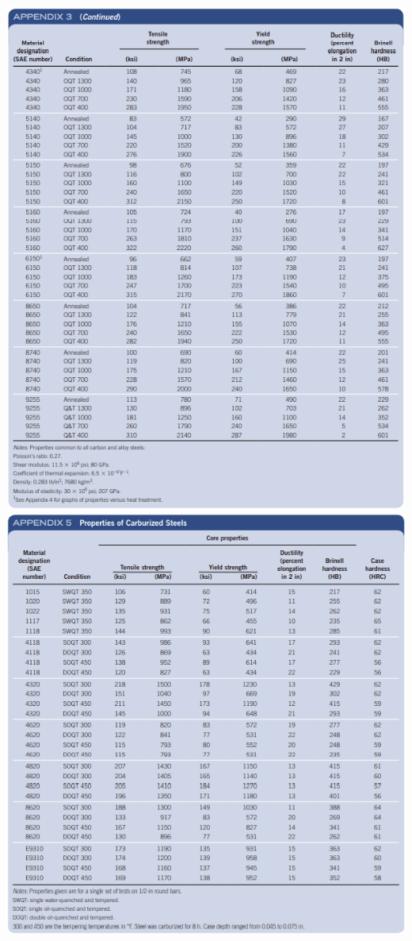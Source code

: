 \documentclass[11pt, fleqn]{article}
\begin{document}
\begin{enumerate}
    \includegraphics[scale=1]{Gears/Apx3b.png}\\
    \includegraphics[scale=1]{Gears/Apx5.png}

\end{enumerate}
\end{document}
